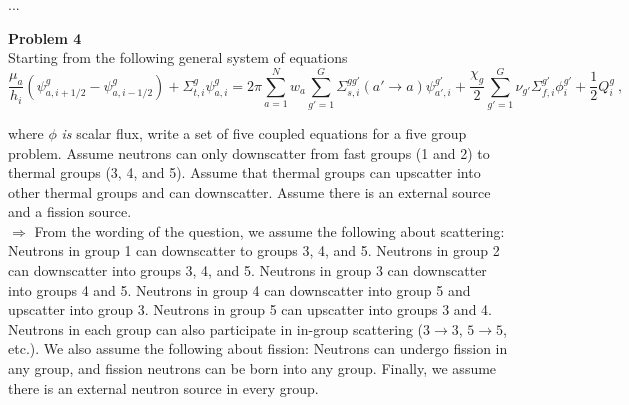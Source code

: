 \documentclass[10pt]{article}
\begin{document}
...





\newpage
\noindent \textbf{Problem 4}\\
Starting from the following general system of equations
%
\begin{equation*}
\frac{\mu_a}{h_i}(\psi_{a,i+1/2}^g - \psi_{a,i-1/2}^g)+ \Sigma_{t,i}^g\psi_{a,i}^g = 2\pi\sum_{a=1}^N w_a \sum_{g'=1}^G \Sigma_{s, i}^{gg'}(a'\rightarrow a)\psi_{a',i}^{g'} + \frac{\chi_g}{2}\sum_{g'=1}^G \nu_{g'}\Sigma_{f,i}^{g'} \phi_{i}^{g'} + \frac{1}{2}Q_i^g\:,
\end{equation*}

where  $\phi$ \textit{is} scalar flux, write a set of five coupled equations for a five group problem. Assume neutrons can only downscatter from fast groups (1 and 2) to thermal groups (3, 4, and 5). Assume that thermal groups can upscatter into other thermal groups and can downscatter. Assume there is an external source and a fission source.\\

$\Rightarrow$ From the wording of the question, we assume the following about scattering: Neutrons in group 1 can downscatter to groups 3, 4, and 5. Neutrons in group 2 can downscatter into groups 3, 4, and 5. Neutrons in group 3 can downscatter into groups 4 and 5. Neutrons in group 4 can downscatter into group 5 and upscatter into group 3. Neutrons in group 5 can upscatter into groups 3 and 4. Neutrons in each group can also participate in in-group scattering ($3\rightarrow3$, $5\rightarrow5$, etc.). We also assume the following about fission: Neutrons can undergo fission in any group, and fission neutrons can be born into any group. Finally, we assume there is an external neutron source in every group. \\

\end{document}
